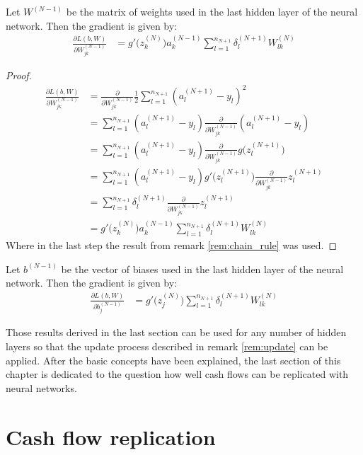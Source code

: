 \begin{remark}
		Let $W^{(N-1)}$ be the matrix of weights used in the last hidden layer of the neural network. Then the gradient is given by: 		
		\begin{align*} %
		\frac{\partial L(b,W)}{\partial W_{jk}^{(N-1)}} 
		&= g'\big( z_k^{(N)}\big) a_k^{(N-1)} \sum_{l = 1}^{n_{N+1}} \delta_l^{(N+1)} W_{lk}^{(N)} 
		\end{align*}		
		
		\begin{proof}
			\begin{align*} %
			\frac{\partial L(b,W)}{\partial W_{jk}^{(N-1)}} 
			&= \frac{\partial}{\partial W_{jk}^{(N-1)}} \frac{1}{2} \sum_{l = 1}^{n_{N+1}} (a_l^{(N+1)} - y_l)^2  \\
			&= \sum_{l = 1}^{n_{N+1}} (a_l^{(N+1)} - y_l) \frac{\partial}{\partial W_{jk}^{(N-1)}} (a_l^{(N+1)} - y_l) \\
			&= \sum_{l = 1}^{n_{N+1}} (a_l^{(N+1)} - y_l) \frac{\partial}{\partial W_{jk}^{(N-1)}} g\big(z_l^{(N+1)} \big) \\
			&= \sum_{l = 1}^{n_{N+1}} (a_l^{(N+1)} - y_l) g'\big(z_l^{(N+1)} \big) \frac{\partial}{\partial W_{jk}^{(N-1)}} z_l^{(N+1)} \\
			&= \sum_{l = 1}^{n_{N+1}} \delta_l^{(N+1)} \frac{\partial}{\partial W_{jk}^{(N-1)}} z_l^{(N+1)} \\
			&= g'\big( z_k^{(N)}\big) a_k^{(N-1)} \sum_{l = 1}^{n_{N+1}} \delta_l^{(N+1)} W_{lk}^{(N)} 
			\end{align*}
			Where in the last step the result from remark \ref{rem:chain_rule} was used. 
		\end{proof}
\end{remark}

\begin{remark}
		Let $b^{(N-1)}$ be the vector of biases used in the last hidden layer of the neural network. Then the gradient is given by:
		\begin{align*} %
			\frac{\partial L(b,W)}{\partial b_j^{(N-1)}} 
			&= g'\big( z_j^{(N)}\big) \sum_{l = 1}^{n_{N+1}} \delta_l^{(N+1)} W_{lk}^{(N)} 
		\end{align*}		
\end{remark}
Those results derived in the last section can be used for any number of hidden layers so that the update process described in remark \ref{rem:update} can be applied. After the basic concepts have been explained, the last section of this chapter is dedicated to the question how well cash flows can be replicated with neural networks. 

\cite{goodfellow2016deep}

\section{Cash flow replication}








